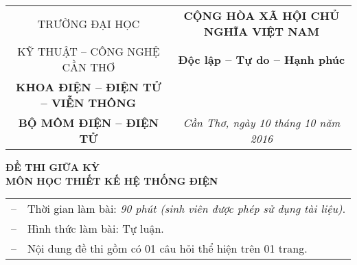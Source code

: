 \documentclass[a4paper, 12pt]{article}
\begin{document}
\begin{center}
\begin{small}
\begin{tabular}{cc}
TRƯỜNG ĐẠI HỌC& \textbf{CỘNG HÒA XÃ HỘI CHỦ NGHĨA VIỆT NAM}\\
KỸ THUẬT -- CÔNG NGHỆ CẦN THƠ&  \textbf{Độc lập -- Tự do -- Hạnh phúc}\\
\textbf{KHOA ĐIỆN -- ĐIỆN TỬ -- VIỄN THÔNG} & \\
\textbf{BỘ MÔM ĐIỆN -- ĐIỆN TỬ} & \emph{Cần Thơ, ngày 10 tháng 10 năm 2016} \\
\end{tabular}
\end{small}
\end{center}
\vspace{.7cm}
\begin{center}
	\begin{Large}
	\textbf{ĐỀ THI GIỮA KỲ} \vspace{.3cm}\\
	\textbf{MÔN HỌC THIẾT KẾ HỆ THỐNG ĐIỆN}\\
	\end{Large}
	\vspace{1cm}
	\begin{center}
	\begin{tabular}{cl}
		-- & Thời gian làm bài: \emph{90 phút (sinh viên được phép sử dụng tài liệu)}.\\
		-- & Hình thức làm bài: Tự luận. \\
		-- & Nội dung đề thi gồm có 01 câu hỏi thể hiện trên 01 trang.\\
	\end{tabular}
	\end{center}
\end{center}
\end{document}
